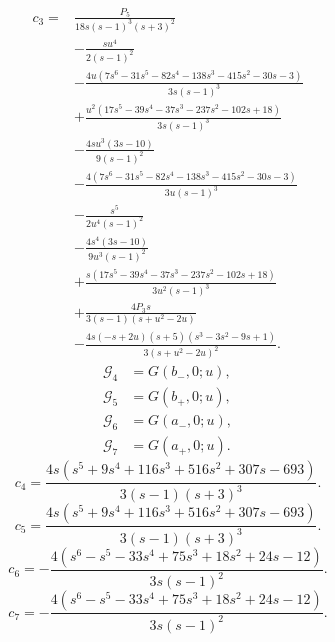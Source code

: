 \begin{align}
c_{3}={}&\frac{P_{5}}{18 s \left(s - 1\right)^{3} \left(s + 3\right)^{2}}\\
&- \frac{s u^{4}}{2 \left(s - 1\right)^{2}}\\
&- \frac{4 u \left(7 s^{6} - 31 s^{5} - 82 s^{4} - 138 s^{3} - 415 s^{2} - 30 s - 3\right)}{3 s \left(s - 1\right)^{3}}\\
&+\frac{u^{2} \left(17 s^{5} - 39 s^{4} - 37 s^{3} - 237 s^{2} - 102 s + 18\right)}{3 s \left(s - 1\right)^{3}}\\
&- \frac{4 s u^{3} \left(3 s - 10\right)}{9 \left(s - 1\right)^{2}}\\
&- \frac{4 \left(7 s^{6} - 31 s^{5} - 82 s^{4} - 138 s^{3} - 415 s^{2} - 30 s - 3\right)}{3 u \left(s - 1\right)^{3}}\\
&- \frac{s^{5}}{2 u^{4} \left(s - 1\right)^{2}}\\
&- \frac{4 s^{4} \left(3 s - 10\right)}{9 u^{3} \left(s - 1\right)^{2}}\\
&+\frac{s \left(17 s^{5} - 39 s^{4} - 37 s^{3} - 237 s^{2} - 102 s + 18\right)}{3 u^{2} \left(s - 1\right)^{3}}\\
&+\frac{4 P_{3} s}{3 \left(s - 1\right) \left(s + u^{2} - 2 u\right)}\\
&- \frac{4 s \left(- s + 2 u\right) \left(s + 5\right) \left(s^{3} - 3 s^{2} - 9 s + 1\right)}{3 \left(s + u^{2} - 2 u\right)^{2}}.
\end{align}
\begin{align}
\mathcal G_{4}&=G(b_{-},0;u),\\
\mathcal G_{5}&=G(b_{+},0;u),\\
\mathcal G_{6}&=G(a_{-},0;u),\\
\mathcal G_{7}&=G(a_{+},0;u).
\end{align}
\begin{equation}
c_{4}=\frac{4 s \left(s^{5} + 9 s^{4} + 116 s^{3} + 516 s^{2} + 307 s - 693\right)}{3 \left(s - 1\right) \left(s + 3\right)^{3}}.
\end{equation}
\begin{equation}
c_{5}=\frac{4 s \left(s^{5} + 9 s^{4} + 116 s^{3} + 516 s^{2} + 307 s - 693\right)}{3 \left(s - 1\right) \left(s + 3\right)^{3}}.
\end{equation}
\begin{equation}
c_{6}=- \frac{4 \left(s^{6} - s^{5} - 33 s^{4} + 75 s^{3} + 18 s^{2} + 24 s - 12\right)}{3 s \left(s - 1\right)^{2}}.
\end{equation}
\begin{equation}
c_{7}=- \frac{4 \left(s^{6} - s^{5} - 33 s^{4} + 75 s^{3} + 18 s^{2} + 24 s - 12\right)}{3 s \left(s - 1\right)^{2}}.
\end{equation}
